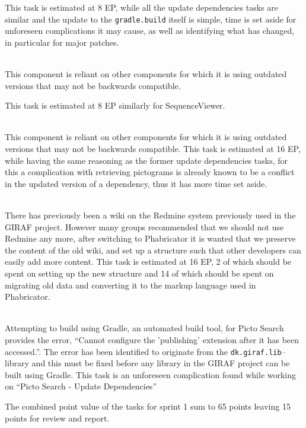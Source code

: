 \begin{description}[style=unboxed]
        This task is estimated at 8 EP, while all the update dependencies tasks are similar and the update to the \texttt{gradle.build} itself is simple, time is set aside for unforeseen complications it may cause, as well as identifying what has changed, in particular for major patches.
    \item[{[}\phigh{]} Sequence --- Update dependencies] \hfill \\
        This component is reliant on other components for which it is using outdated versions that may not be backwards compatible.

        This task is estimated at 8 EP similarly for SequenceViewer.
    \item[{[}\phigh{]} Picto Search --- Update dependencies] \hfill \\
        This component is reliant on other components for which it is using outdated versions that may not be backwards compatible.
        This task is estimated at 16 EP, while having the same reasoning as the former update dependencies tasks, for this a complication with retrieving pictograms is already known to be a conflict in the updated version of a dependency, thus it has more time set aside.
    \item[{[}\phigh{]} Wiki --- Setup new structure and migrate to Phabricator] \hfill \\
        There has previously been a wiki on the Redmine system previously used in the GIRAF project.
        However many groups recommended that we should not use Redmine any more, after switching to Phabricator it is wanted that we preserve the content of the old wiki, and set up a structure such that other developers can easily add more content.
        This task is estimated at 16 EP, 2 of which should be spent on setting up the new structure and 14 of which should be spent on migrating old data and converting it to the markup language used in Phabricator.

    \item[{[}\pblocking{]} Gradle --- Custom plug-in dk.giraf.lib for gradle breaks build] \hfill \\
        Attempting to build using Gradle, an automated build tool, for Picto Search provides the error, \enquote{Cannot configure the 'publishing' extension after it has been accessed.}.
        The error has been identified to originate from the \texttt{dk.giraf.lib}--library and this must be fixed before any library in the GIRAF project can be built using Gradle.
        This task is an unforeseen complication found while working on \enquote{Picto Search - Update Dependencies}
\end{description}
The combined point value of the tasks for sprint 1 sum to 65 points leaving 15 points for review and report.

